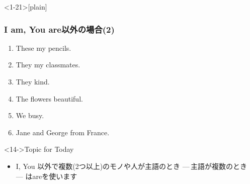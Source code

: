 \documentclass[aspectratio=169,xcolor={dvipsnames,table}]{beamer}
\begin{document}
\begin{frame}<1-21>[plain]\frametitle{I am, You are以外の場合(2)}
  \begin{enumerate}
   \item<1-> These \textbf{\color{Maroon}{are}} my pencils. \hfill{}
   \item<1-> They \textbf{\color{Maroon}{are}} my classmates. \hfill{}
   \item<1-> They \textbf{\color{Maroon}{are}} kind. \hfill{}
   \item<1-> The flowers \textbf{\color{Maroon}{are}} beautiful. \hfill{}
   \item<1-> We \textbf{\color{Maroon}{are}} busy. \hfill{}
   \item<1-> Jane and George \textbf{\color{Maroon}{are}} from France. \hfill{}
  \end{enumerate}

\bigskip

\begin{exampleblock}<14->{Topic for Today}
\begin{itemize}
 \item   I, You 以外で複数(2つ以上)のモノや人が主語のとき\,\,---\,主語が複数のとき\,---\,\,はareを使います
\end{itemize}
     \end{exampleblock}

\end{frame}
\end{document}
